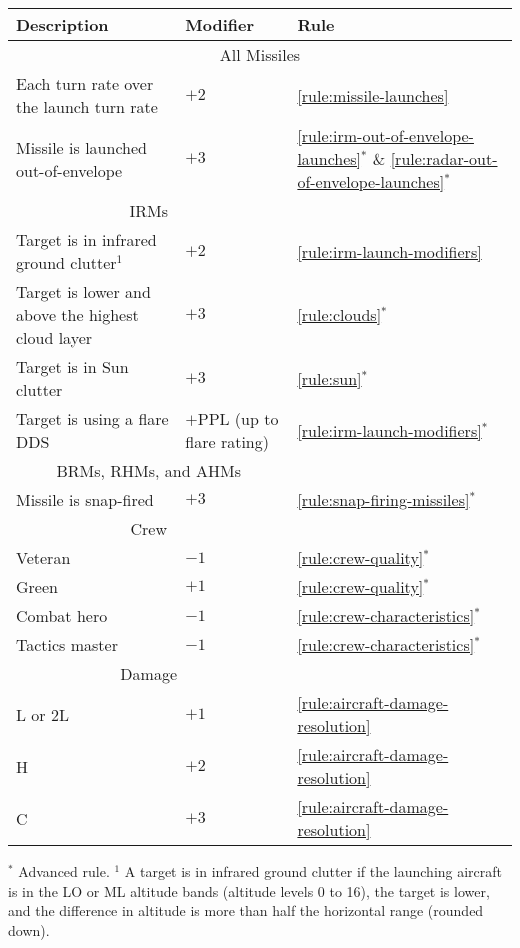 {\begin{twocolumntablefloat}
\begin{twocolumntable}
\begin{tabularx}{0.9\linewidth}{Xll}
\toprule
Description&Modifier&Rule\\
\midrule
\multicolumn{3}{c}{All Missiles}\\
\midrule
Each turn rate over the launch turn rate&$+2$&\ref{rule:missile-launches}\\
Missile is launched out-of-envelope&$+3$&\ref{rule:irm-out-of-envelope-launches}$^*$ \& \ref{rule:radar-out-of-envelope-launches}$^*$\\
\midrule
\multicolumn{2}{c}{IRMs}\\
\midrule
Target is in infrared ground clutter$^1$&$+2$&\ref{rule:irm-launch-modifiers}\\
Target is lower and above the highest cloud layer&$+3$&\ref{rule:clouds}$^*$
\\
Target is in Sun clutter&$+3$&\ref{rule:sun}$^*$\\
Target is using a flare DDS&$+$PPL (up to flare rating)&\ref{rule:irm-launch-modifiers}$^*$\\
\midrule
\multicolumn{2}{c}{BRMs, RHMs, and AHMs}\\
\midrule
Missile is snap-fired&$+3$&\ref{rule:snap-firing-missiles}$^*$\\
\midrule
\multicolumn{2}{c}{Crew}\\
\midrule
Veteran&$-1$&\ref{rule:crew-quality}$^*$\\
Green&$+1$&\ref{rule:crew-quality}$^*$\\
Combat hero&$-1$&\ref{rule:crew-characteristics}$^*$\\
Tactics master&$-1$&\ref{rule:crew-characteristics}$^*$\\
\midrule
\multicolumn{2}{c}{Damage}\\
\midrule
L or 2L&$+1$&\ref{rule:aircraft-damage-resolution}\\
H&$+2$&\ref{rule:aircraft-damage-resolution}\\
C&$+3$&\ref{rule:aircraft-damage-resolution}\\
\bottomrule
\end{tabularx}
\begin{tablenote}{0.9\linewidth}
$^*$ Advanced rule. $^1$ A target is in infrared ground clutter if the launching aircraft is in the LO or ML altitude bands (altitude levels 0 to 16), the target is lower, and the difference in altitude is more than half the horizontal range (rounded down).
\end{tablenote}
\end{twocolumntable}
\end{twocolumntablefloat}
}

